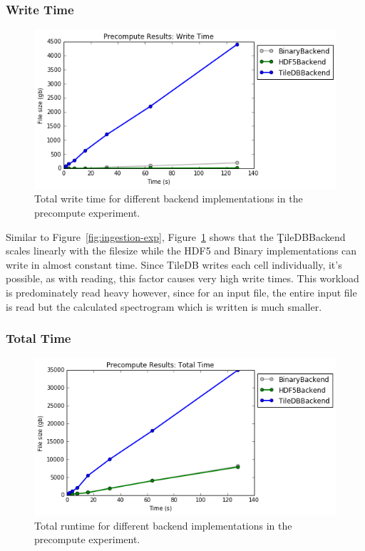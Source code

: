 \subsubsection{Write Time}

\begin{figure}[h]
\begin{center}
\includegraphics[scale=0.75]{./img/precompute-exp-write-time.png}
\caption{Total write time for different backend implementations in the
  precompute experiment.}
\label{fig:precompute-exp-write-time}
\end{center}
\end{figure}

Similar to Figure~\ref{fig:ingestion-exp},
Figure~\ref{fig:precompute-exp-write-time} shows that the \c{TileDBBackend}
scales linearly with the filesize while the HDF5 and Binary implementations can
write in almost constant time. Since TileDB writes each cell individually, it's
possible, as with reading, this factor causes very high write times. This
workload is predominately read heavy however, since for an input file, the
entire input file is read but the calculated spectrogram which is written is
much smaller.

\subsubsection{Total Time}

\begin{figure}[h]
\begin{center}
\includegraphics[scale=0.75]{./img/precompute-exp-total-time.png}
\caption{Total runtime for different backend implementations in the precompute
  experiment.}
\label{fig:precompute-exp-total-time}
\end{center}
\end{figure}

